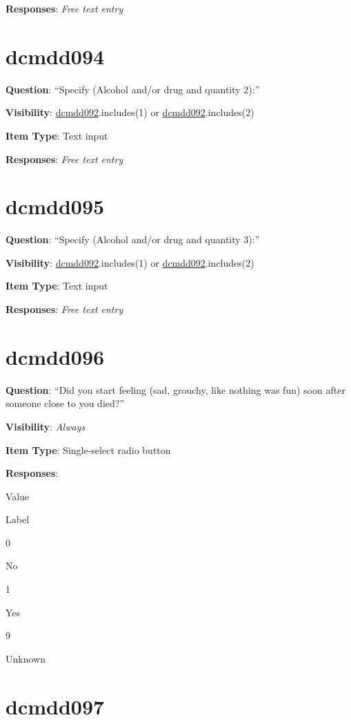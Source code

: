 \documentclass[]{book}
\begin{document}
\textbf{Responses}: \emph{Free text entry}

\hypertarget{dcmdd094}{%
\section{dcmdd094}\label{dcmdd094}}

\textbf{Question}: ``Specify (Alcohol and/or drug and quantity 2):''

\textbf{Visibility}: \protect\hyperlink{dcmdd092}{dcmdd092}.includes(1) or \protect\hyperlink{dcmdd092}{dcmdd092}.includes(2)

\textbf{Item Type}: Text input

\textbf{Responses}: \emph{Free text entry}

\hypertarget{dcmdd095}{%
\section{dcmdd095}\label{dcmdd095}}

\textbf{Question}: ``Specify (Alcohol and/or drug and quantity 3):''

\textbf{Visibility}: \protect\hyperlink{dcmdd092}{dcmdd092}.includes(1) or \protect\hyperlink{dcmdd092}{dcmdd092}.includes(2)

\textbf{Item Type}: Text input

\textbf{Responses}: \emph{Free text entry}

\hypertarget{dcmdd096}{%
\section{dcmdd096}\label{dcmdd096}}

\textbf{Question}: ``Did you start feeling (sad, grouchy, like nothing was fun) soon after someone close to you died?''

\textbf{Visibility}: \emph{Always}

\textbf{Item Type}: Single-select radio button

\textbf{Responses}:

Value

Label

0

No

1

Yes

9

Unknown

\hypertarget{dcmdd097}{%
\section{dcmdd097}\label{dcmdd097}}
\end{document}
